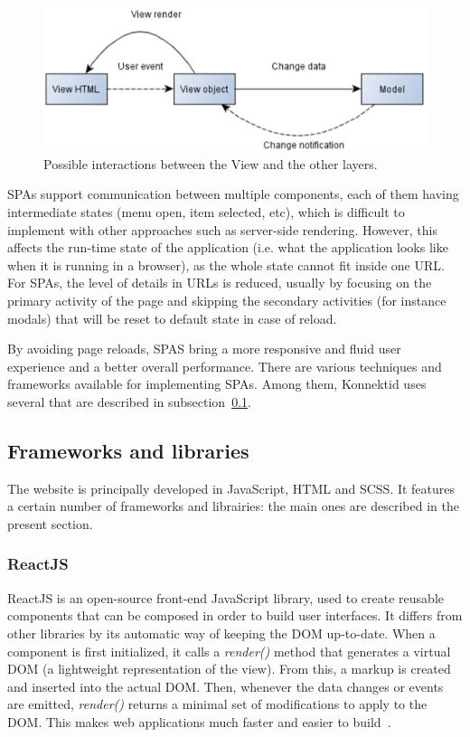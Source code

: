\begin{figure}[H]
    \centering
    \includegraphics[scale=0.6]{figure/view.png}
    \caption{Possible interactions between the View and the other layers.}
    \label{fig:view}
\end{figure}

SPAs support communication between multiple components, each of them having intermediate states (menu open, item selected, etc), which is difficult to
implement with other approaches such as server-side rendering. However, this affects the run-time state of the application (i.e. what the application looks like when it is
running in a browser), as the whole state cannot fit inside one URL. For SPAs, the level of details in URLs is reduced, usually by focusing on the primary activity
of the page and skipping the secondary activities (for instance modals) that will be reset to default state in case of reload.

By avoiding page reloads, SPAS bring a more responsive and fluid user experience and a better overall performance.
There are various techniques and frameworks available for implementing SPAs.
Among them, Konnektid uses several that are described in {\sc subsection}~\ref{ssec:frameworks}.

\subsection{Frameworks and libraries}
\label{ssec:frameworks}

The website is principally developed in JavaScript, HTML and SCSS. It features a certain number of frameworks and librairies: the main ones are described in the present section.

\subsubsection{ReactJS}
\label{sssec:react}

ReactJS is an open-source front-end JavaScript library, used to create reusable components that can be composed in order to build user interfaces. It differs from other libraries by its automatic way of keeping the DOM up-to-date. 
When a component is first initialized, it calls a \textit{render()} method that generates a \guillemotleft{} virtual DOM \guillemotright{} (a lightweight representation of the view). From this, a markup is created and inserted into the actual DOM. 
Then, whenever the data changes or events are emitted, \textit{render()} returns a minimal set of modifications to apply to the DOM.
This makes web applications much faster and easier to build~\cite{whyReact}.

